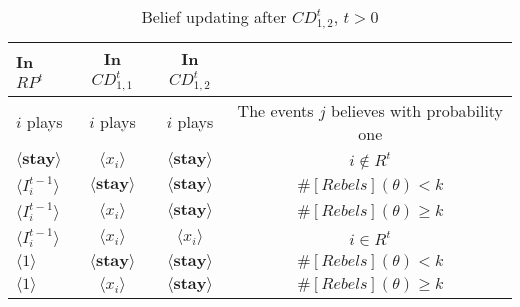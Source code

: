 \documentclass[12pt,letterpaper]{article}
\theoremstyle{definition}
\theoremstyle{remark}
\theoremstyle{claim}
\begin{document}
\begin{table}[ht]
\caption{Belief updating after $CD^t_{1,2}$, $t>0$}
\label{Table_blf_up_cdt12}
\begin{center}
\begin{tabular}{l c c c}
In $RP^t$ 	 	&  	In $CD^t_{1,1}$		&  In $CD^t_{1,2}$	  &\\
\hline
\hline
$i$ plays 		                             &  	$i$ plays		&				$i$ plays			& The events $j$ believes with probability one  \\
\hline
$\langle  \textbf{stay} \rangle$ 	& 	$\langle x_i \rangle$	&  $\langle \textbf{stay} \rangle$ &  $i\notin R^t$ \\
$\langle  {I^{t-1}_i} \rangle$ 		&  $\langle \textbf{stay} \rangle$	&	$\langle \textbf{stay} \rangle$ &  $\#[Rebels](\theta)< k$   \\
$\langle  {I^{t-1}_i} \rangle$ 		&  $\langle x_i \rangle$	&	$\langle \textbf{stay} \rangle$ &  $\#[Rebels](\theta)\geq k$    \\
$\langle  {I^{t-1}_i} \rangle$ 		&  $\langle x_i \rangle$	&	$\langle x_i \rangle$ &  $i\in R^t$  \\
$\langle 1 \rangle$ 		             &  $\langle \textbf{stay} \rangle$	&	$\langle \textbf{stay} \rangle$ &  $\#[Rebels](\theta)< k$\\
$\langle 1 \rangle$ 		             &  $\langle x_i \rangle$	&	$\langle \textbf{stay} \rangle$ & $\#[Rebels](\theta)\geq k$
\end{tabular}
\end{center}
\end{table}
\end{document}
